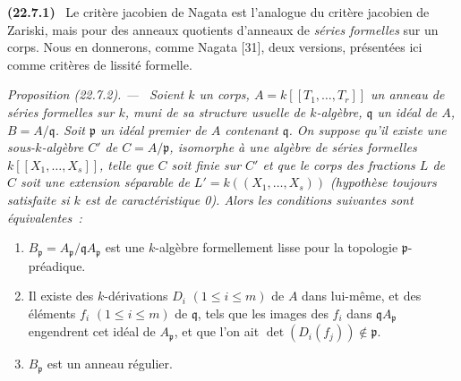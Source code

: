 \documentclass[10pt,oneside]{book}
\makeatletter
\newcommand{\setmanualcurrentlabel}[1]{\def\@currentlabel{#1}}
\newenvironment{env}[1][]{\setmanualcurrentlabel{#1}\par\medskip\noindent\textbf{(#1)}\ }{\par}
\newenvironment{proposition}[1][]{%
  \setmanualcurrentlabel{#1}\par\medskip\noindent\itshape Proposition (#1). ---\ }{\par}
\makeatother
\begin{document}
\begin{env}[22.7.1]
\label{0.22.7.1-fr}
Le critère jacobien de Nagata est l'analogue du critère jacobien de Zariski,
mais pour des anneaux quotients d'anneaux de \emph{séries formelles} sur un
corps. Nous en donnerons, comme Nagata [31], deux versions, présentées ici
comme critères de lissité formelle.
\end{env}

\begin{proposition}[22.7.2]
\label{0.22.7.2-fr}
Soient $k$ un corps, $A=k[[T_1,\ldots,T_r]]$ un anneau de séries formelles sur
$k$, muni de sa structure usuelle de $k$-algèbre, $\mathfrak q$ un idéal de
$A$, $B=A/\mathfrak q$. Soit $\mathfrak p$ un idéal premier de $A$ contenant
$\mathfrak q$. On suppose qu'il existe une sous-$k$-algèbre $C'$ de
$C=A/\mathfrak p$, isomorphe à une algèbre de séries formelles
$k[[X_1,\ldots,X_s]]$, telle que $C$ soit finie sur $C'$ et que le corps des
fractions $L$ de $C$ soit une extension séparable de
$L'=k((X_1,\ldots,X_s))$ (hypothèse toujours satisfaite si $k$ est de
caractéristique 0). Alors les conditions suivantes sont équivalentes~:
\begin{enumerate}
  \item[a)] $B_{\mathfrak p}=A_{\mathfrak p}/\mathfrak qA_{\mathfrak p}$ est
  une $k$-algèbre formellement lisse pour la topologie
  $\mathfrak p$-préadique.
  \item[b)] Il existe des $k$-dérivations $D_i$ $(1\leq i\leq m)$ de $A$ dans
  lui-même, et des éléments $f_i$ $(1\leq i\leq m)$ de $\mathfrak q$, tels
  que les images des $f_i$ dans $\mathfrak qA_{\mathfrak p}$ engendrent cet
  idéal de $A_{\mathfrak p}$, et que l'on ait
  $\det(D_i(f_j))\notin\mathfrak p$.
  \item[c)] $B_{\mathfrak p}$ est un anneau régulier.
\end{enumerate}
\end{proposition}
\end{document}
